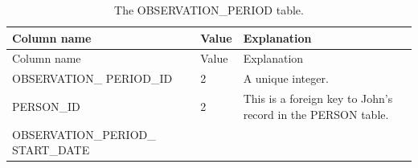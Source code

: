 \documentclass[11pt]{book}
\theoremstyle{definition}
\theoremstyle{definition}
\theoremstyle{definition}
\theoremstyle{remark}
\begin{document}
\begin{longtable}[]{@{}lll@{}}
\caption{\label{tab:johnOp} The OBSERVATION\_PERIOD table.}\tabularnewline
\toprule
\begin{minipage}[b]{0.29\columnwidth}\raggedright\strut
Column name\strut
\end{minipage} & \begin{minipage}[b]{0.14\columnwidth}\raggedright\strut
Value\strut
\end{minipage} & \begin{minipage}[b]{0.48\columnwidth}\raggedright\strut
Explanation\strut
\end{minipage}\tabularnewline
\midrule
\endfirsthead
\toprule
\begin{minipage}[b]{0.29\columnwidth}\raggedright\strut
Column name\strut
\end{minipage} & \begin{minipage}[b]{0.14\columnwidth}\raggedright\strut
Value\strut
\end{minipage} & \begin{minipage}[b]{0.48\columnwidth}\raggedright\strut
Explanation\strut
\end{minipage}\tabularnewline
\midrule
\endhead
\begin{minipage}[t]{0.29\columnwidth}\raggedright\strut
OBSERVATION\_ PERIOD\_ID\strut
\end{minipage} & \begin{minipage}[t]{0.14\columnwidth}\raggedright\strut
2\strut
\end{minipage} & \begin{minipage}[t]{0.48\columnwidth}\raggedright\strut
A unique integer.\strut
\end{minipage}\tabularnewline
\begin{minipage}[t]{0.29\columnwidth}\raggedright\strut
PERSON\_ID\strut
\end{minipage} & \begin{minipage}[t]{0.14\columnwidth}\raggedright\strut
2\strut
\end{minipage} & \begin{minipage}[t]{0.48\columnwidth}\raggedright\strut
This is a foreign key to John's record in the PERSON table.\strut
\end{minipage}\tabularnewline
\begin{minipage}[t]{0.29\columnwidth}\raggedright\strut
OBSERVATION\_PERIOD\_ START\_DATE\strut
\end{minipage} & \begin{minipage}[t]{0.14\columnwidth}\raggedright\strut

\end{minipage}
\end{longtable}
\end{document}
